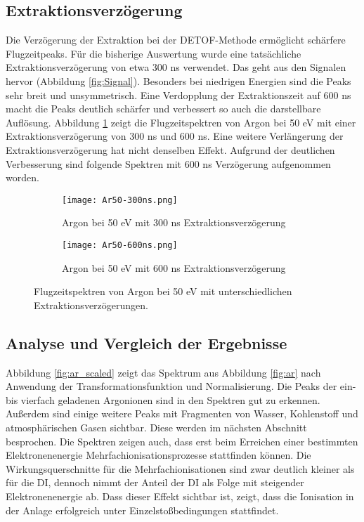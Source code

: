 \subsection{Extraktionsverzögerung}
Die Verzögerung der Extraktion bei der DETOF-Methode ermöglicht schärfere Flugzeitpeaks. Für die bisherige Auswertung wurde eine tatsächliche Extraktionsverzögerung von etwa 300 ns verwendet. Das geht aus den Signalen hervor (Abbildung \ref{fig:Signal}). Besonders bei niedrigen Energien sind die Peaks sehr breit und unsymmetrisch. Eine Verdopplung der Extraktionszeit auf 600 ns macht die Peaks deutlich schärfer und verbessert so auch die darstellbare Auflösung. Abbildung \ref{fig:delay} zeigt die Flugzeitspektren von Argon bei 50 eV mit einer Extraktionsverzögerung von 300 ns und 600 ns. Eine weitere Verlängerung der Extraktionsverzögerung hat nicht denselben Effekt. Aufgrund der deutlichen Verbesserung sind folgende Spektren mit 600 ns Verzögerung aufgenommen worden.
\begin{figure}
    \centering
    \begin{subfigure}{.65\textwidth}
        \centering
        \texttt{[image: Ar50-300ns.png]}
        \caption{Argon bei 50 eV mit 300 ns Extraktionsverzögerung}
    \end{subfigure}%
    \hfill
    \begin{subfigure}{.65\textwidth}
        \centering
        \texttt{[image: Ar50-600ns.png]}
        \caption{Argon bei 50 eV mit 600 ns Extraktionsverzögerung}
        
    \end{subfigure}
    \caption[Einfluss der Extraktionsverzögerung auf Flugzeitspektren]{Flugzeitspektren von Argon bei 50 eV mit unterschiedlichen Extraktionsverzögerungen.}
    \label{fig:delay}
\end{figure}

\subsection{Analyse und Vergleich der Ergebnisse}
Abbildung \ref{fig:ar_scaled} zeigt das Spektrum aus Abbildung \ref{fig:ar} nach Anwendung der Transformationsfunktion und Normalisierung. Die Peaks der ein- bis vierfach geladenen Argonionen sind in den Spektren gut zu erkennen. Außerdem sind einige weitere Peaks mit Fragmenten von Wasser, Kohlenstoff und atmosphärischen Gasen sichtbar. Diese werden im nächsten Abschnitt besprochen. Die Spektren zeigen auch, dass erst beim Erreichen einer bestimmten Elektronenenergie Mehrfachionisationsprozesse stattfinden können. Die Wirkungsquerschnitte für die Mehrfachionisationen sind zwar deutlich kleiner als für die DI, dennoch nimmt der Anteil der DI als Folge mit steigender Elektronenenergie ab. Dass dieser Effekt sichtbar ist, zeigt, dass die Ionisation in der Anlage erfolgreich unter Einzelstoßbedingungen stattfindet. 


